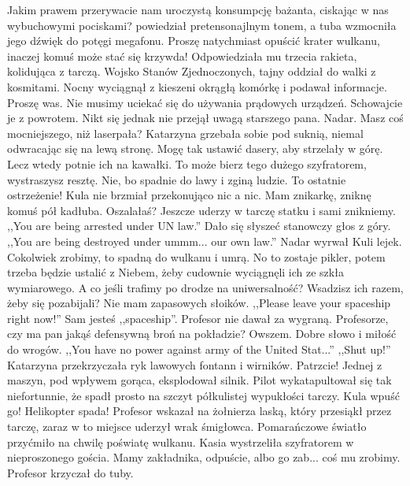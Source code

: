 \begin{dialogue}
\ds{} Jakim prawem przerywacie nam uroczystą konsumpcję bażanta, ciskając w nas wybuchowymi pociskami? \dm{}
powiedział pretensonajlnym tonem, a tuba wzmocniła jego dźwięk do potęgi megafonu. \dm{}
Proszę natychmiast opuścić krater wulkanu, inaczej komuś może stać się krzywda! \dm{} Odpowiedziała mu trzecia rakieta, kolidująca z tarczą.
\ds{} Wojsko Stanów Zjednoczonych, tajny oddział do walki z kosmitami. \dm{} Nocny wyciągnął z kieszeni okrągłą komórkę i podawał informacje.
\ds{} Proszę was. Nie musimy uciekać się do używania prądowych urządzeń. Schowajcie je z powrotem. \dm{} Nikt się jednak nie przejął uwagą starszego pana.
\ds{} Nadar. Masz coś mocniejszego, niż laserpała? \dm{} Katarzyna grzebała sobie pod suknią, niemal odwracając się na lewą stronę.
\ds{} Mogę tak ustawić dasery, aby strzelały w górę. Lecz wtedy potnie ich na kawałki.
\ds{} To może bierz tego dużego szyfratorem, wystraszysz resztę.
\ds{} Nie, bo spadnie do lawy i zginą ludzie.
\ds{} To ostatnie ostrzeżenie! \dm{} Kula nie brzmiał przekonująco nic a nic.
\ds{} Mam znikarkę, zniknę komuś pół kadłuba.
\ds{} Oszalałaś? Jeszcze uderzy w tarczę statku i sami znikniemy.
\ds{} ,,You are being arrested under UN law.'' \dm{} Dało się słyszeć stanowczy głos z góry.
\ds{} ,,You are being destroyed under ummm... our own law.'' \dm{} Nadar wyrwał Kuli lejek.
\ds{} Cokolwiek zrobimy, to spadną do wulkanu i umrą.
\ds{} No to zostaje pikler, potem trzeba będzie ustalić z Niebem, żeby cudownie wyciągnęli ich ze szkła wymiarowego.
\ds{} A co jeśli trafimy po drodze na uniwersalność? Wsadzisz ich razem, żeby się pozabijali? Nie mam zapasowych słoików.
\ds{} ,,Please leave your spaceship right now!''
\ds{} Sam jesteś ,,spaceship''. \dm{} Profesor nie dawał za wygraną.
\ds{} Profesorze, czy ma pan jakąś defensywną broń na pokładzie?
\ds{} Owszem. Dobre słowo i miłość do wrogów.
\ds{} ,,You have no power against army of the United Stat...''
\ds{} ,,Shut up!'' \dm{} Katarzyna przekrzyczała ryk lawowych fontann i wirników.
\ds{} Patrzcie! \dm{} Jednej z maszyn, pod wpływem gorąca, eksplodował silnik. Pilot wykatapultował się tak niefortunnie, że spadł prosto na szczyt półkulistej wypukłości tarczy.
\ds{} Kula wpuść go! Helikopter spada! \dm{} Profesor wskazał na żołnierza laską, który przesiąkł przez tarczę, zaraz w to miejsce uderzył wrak śmigłowca. 
Pomarańczowe światło przyćmiło na chwilę poświatę wulkanu. Kasia wystrzeliła szyfratorem w nieproszonego gościa.
\ds{} Mamy zakładnika, odpuście, albo go zab... coś mu zrobimy. \dm{} Profesor krzyczał do tuby.

\end{dialogue}
